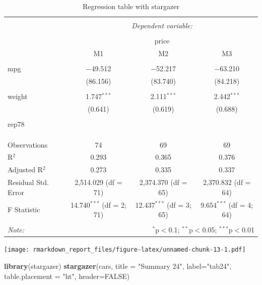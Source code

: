\documentclass[
  12pt,
]{article}
\newenvironment{Shaded}{\begin{snugshade}}{\end{snugshade}}
\newcommand{\DataTypeTok}[1]{\textcolor[rgb]{0.13,0.29,0.53}{#1}}
\newcommand{\KeywordTok}[1]{\textcolor[rgb]{0.13,0.29,0.53}{\textbf{#1}}}
\newcommand{\NormalTok}[1]{#1}
\newcommand{\OtherTok}[1]{\textcolor[rgb]{0.56,0.35,0.01}{#1}}
\newcommand{\StringTok}[1]{\textcolor[rgb]{0.31,0.60,0.02}{#1}}
\begin{document}
\begin{table}[ht] \centering 
  \caption{Regression table with stargazer} 
  \label{tab3} 
\begin{tabular}{@{\extracolsep{5pt}}lccc} 
\\[-1.8ex]\hline 
\hline \\[-1.8ex] 
 & \multicolumn{3}{c}{\textit{Dependent variable:}} \\ 
\cline{2-4} 
\\[-1.8ex] & \multicolumn{3}{c}{price} \\ 
 & M1 & M2 & M3 \\ 
\hline \\[-1.8ex] 
 mpg & $-$49.512 & $-$52.217 & $-$63.210 \\ 
  & (86.156) & (83.740) & (84.218) \\ 
  & & & \\ 
 weight & 1.747$^{***}$ & 2.111$^{***}$ & 2.442$^{***}$ \\ 
  & (0.641) & (0.619) & (0.688) \\ 
  & & & \\ 
 rep78 &  &  &  \\ 
  &  &  &  \\ 
  & & & \\ 
\hline \\[-1.8ex] 
Observations & 74 & 69 & 69 \\ 
R$^{2}$ & 0.293 & 0.365 & 0.376 \\ 
Adjusted R$^{2}$ & 0.273 & 0.335 & 0.337 \\ 
Residual Std. Error & 2,514.029 (df = 71) & 2,374.370 (df = 65) & 2,370.832 (df = 64) \\ 
F Statistic & 14.740$^{***}$ (df = 2; 71) & 12.437$^{***}$ (df = 3; 65) & 9.654$^{***}$ (df = 4; 64) \\ 
\hline 
\hline \\[-1.8ex] 
\textit{Note:}  & \multicolumn{3}{r}{$^{*}$p$<$0.1; $^{**}$p$<$0.05; $^{***}$p$<$0.01} \\ 
\end{tabular} 
\end{table}

\texttt{[image: rmarkdown\_report\_files/figure-latex/unnamed-chunk-13-1.pdf]}

\begin{Shaded}
\begin{Highlighting}[]
\KeywordTok{library}\NormalTok{(stargazer)}
\KeywordTok{stargazer}\NormalTok{(cars, }
          \DataTypeTok{title =} \StringTok{"Summary 24"}\NormalTok{,}
          \DataTypeTok{label=}\StringTok{"tab24"}\NormalTok{, }
          \DataTypeTok{table.placement =} \StringTok{"ht"}\NormalTok{, }
          \DataTypeTok{header=}\OtherTok{FALSE}\NormalTok{)}
\end{Highlighting}
\end{Shaded}
\end{document}
